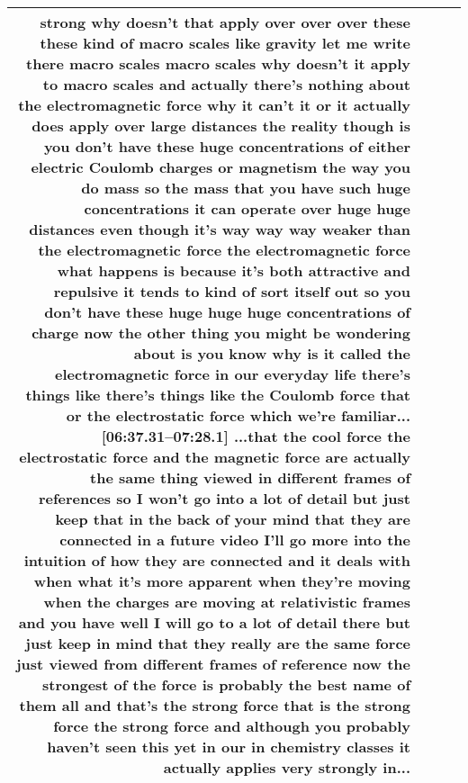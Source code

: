 \documentclass[10pt]{article}
\begin{document}
\begin{tiny}
\begin{longtable}{|r|p{0.375in}|p{1.275in}|p{3.5in}|}
strong why doesn't that apply over over over these these kind of macro scales like gravity let me write there macro scales macro scales why doesn't it apply to macro scales and actually there's nothing about the electromagnetic force why it can't it or it actually does apply over large distances the reality though is you don't have these huge concentrations of either electric Coulomb charges or magnetism the way you do mass so the mass that you have such huge concentrations it can operate over huge huge distances even though it's way way way weaker than the electromagnetic force the electromagnetic force what happens is because it's both attractive and repulsive it tends to kind of sort itself out so you don't have these huge huge huge concentrations of charge now the other thing you might be wondering about is you know why is it called the electromagnetic force in our everyday life there's things like there's things like the Coulomb force that or the electrostatic force which we're familiar...\newline\textbf{[06:37.31--07:28.1]} ...that the cool force the electrostatic force and the magnetic force are actually the same thing viewed in different frames of references so I won't go into a lot of detail but just keep that in the back of your mind that they are connected in a future video I'll go more into the intuition of how they are connected and it deals with when what it's more apparent when they're moving when the charges are moving at relativistic frames and you have well I will go to a lot of detail there but just keep in mind that they really are the same force just viewed from different frames of reference now the strongest of the force is probably the best name of them all and that's the strong force that is the strong force the strong force and although you probably haven't seen this yet in our in chemistry classes it actually applies very strongly in... \\\hline

\end{longtable}
\end{tiny}
\end{document}
